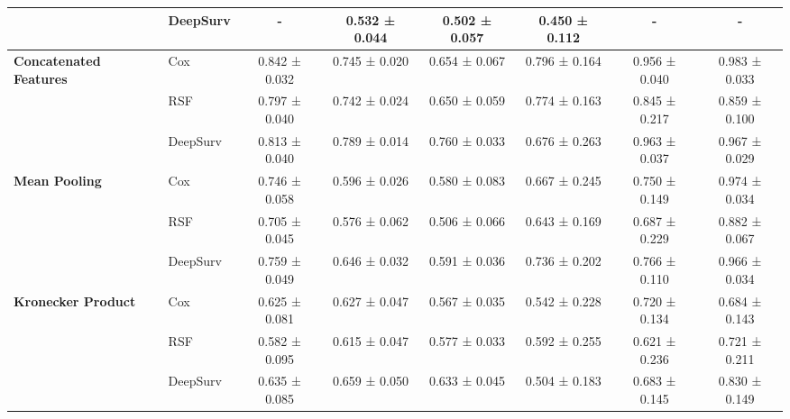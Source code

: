 \begin{sidewaystable}[htbp]
\begin{tabular}{@{}llcccccc@{}}
        & DeepSurv & - & 0.532 ± 0.044 & 0.502 ± 0.057 & 0.450 ± 0.112 & - & - \\
        \midrule
        \multirow{3}{*}{\textbf{Concatenated Features}} & Cox & 0.842 ± 0.032 & 0.745 ± 0.020 & 0.654 ± 0.067 & 0.796 ± 0.164 & 0.956 ± 0.040 & 0.983 ± 0.033 \\
        & RSF & 0.797 ± 0.040 & 0.742 ± 0.024 & 0.650 ± 0.059 & 0.774 ± 0.163 & 0.845 ± 0.217 & 0.859 ± 0.100 \\
        & DeepSurv & 0.813 ± 0.040 & 0.789 ± 0.014 & 0.760 ± 0.033 & 0.676 ± 0.263 & 0.963 ± 0.037 & 0.967 ± 0.029 \\
        \midrule
        \multirow{3}{*}{\textbf{Mean Pooling}} & Cox & 0.746 ± 0.058 & 0.596 ± 0.026 & 0.580 ± 0.083 & 0.667 ± 0.245 & 0.750 ± 0.149 & 0.974 ± 0.034 \\
        & RSF & 0.705 ± 0.045 & 0.576 ± 0.062 & 0.506 ± 0.066 & 0.643 ± 0.169 & 0.687 ± 0.229 & 0.882 ± 0.067 \\
        & DeepSurv & 0.759 ± 0.049 & 0.646 ± 0.032 & 0.591 ± 0.036 & 0.736 ± 0.202 & 0.766 ± 0.110 & 0.966 ± 0.034 \\
        \midrule
        \multirow{3}{*}{\textbf{Kronecker Product}} & Cox & 0.625 ± 0.081 & 0.627 ± 0.047 & 0.567 ± 0.035 & 0.542 ± 0.228 & 0.720 ± 0.134 & 0.684 ± 0.143 \\
        & RSF & 0.582 ± 0.095 & 0.615 ± 0.047 & 0.577 ± 0.033 & 0.592 ± 0.255 & 0.621 ± 0.236 & 0.721 ± 0.211 \\
        & DeepSurv & 0.635 ± 0.085 & 0.659 ± 0.050 & 0.633 ± 0.045 & 0.504 ± 0.183 & 0.683 ± 0.145 & 0.830 ± 0.149 \\
        \bottomrule
    \end{tabular}
\end{sidewaystable}

